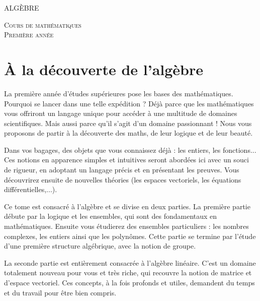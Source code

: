 
\pagestyle{empty}\thispagestyle{empty}
\vspace*{\fill}
\begin{center}
\fontsize{52}{52}\selectfont
\textsc{ALGÈBRE}
\end{center}
\vfill
\begin{center}
\huge
\textsc{Cours de mathématiques}\\ 
\textsc{Première année}
\end{center}

\begin{center}
\end{center}
\clearemptydoublepage
\thispagestyle{empty}

\vspace*{\fill}
\section*{À la découverte de l'algèbre}


La première année d'études supérieures pose les bases des mathématiques. 
Pourquoi se lancer dans une telle expédition ? Déjà parce que les mathématiques vous offriront 
un langage unique pour accéder à une multitude de domaines scientifiques. Mais aussi 
parce qu'il s'agit d'un domaine passionnant ! Nous vous proposons de partir à la découverte 
des maths, de leur logique et de leur beauté. 


Dans vos bagages, des objets que vous connaissez déjà : les entiers, les fonctions... 
Ces notions en apparence simples et intuitives seront abordées ici avec un souci de rigueur, 
en adoptant un langage précis et en présentant les preuves. Vous découvrirez ensuite de 
nouvelles théories (les espaces vectoriels, les équations différentielles,...).

\medskip

Ce tome est consacré à l'algèbre et se divise en deux parties. 
La première partie débute par la logique et les ensembles, qui sont des 
fondamentaux en mathématiques. Ensuite vous étudierez des ensembles particuliers : 
les nombres complexes, les entiers ainsi que les polynômes. Cette partie se termine 
par l'étude d'une première structure algébrique, avec la notion de groupe.

La seconde partie est entièrement consacrée à l'algèbre linéaire. C'est un domaine 
totalement nouveau pour vous et très riche, qui recouvre la notion de matrice et 
d'espace vectoriel. Ces concepts, à la fois profonds et utiles, demandent du temps 
et du travail pour être bien compris.

